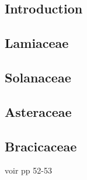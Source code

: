 \subsection{Introduction}


\subsection{Lamiaceae}


\subsection{Solanaceae}


\subsection{Asteraceae}


\subsection{Bracicaceae}


voir \cite{laporte2023} pp 52-53
